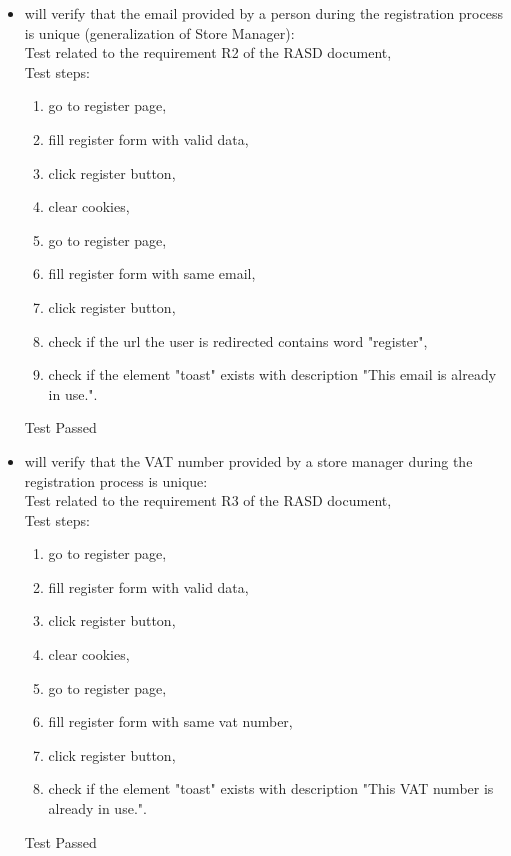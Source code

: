 \begin{itemize}
    \item will verify that the email provided by a person during the registration process is unique (generalization of Store Manager): \\
    Test related to the requirement R2 of the RASD document, \\
    Test steps:
    \begin{enumerate}
        \item go to register page,
        \item fill register form with valid data,
        \item click register button,
        \item clear cookies,
        \item go to register page,
        \item fill register form with same email,
        \item click register button,
        \item check if the url the user is redirected contains word "register",
        \item check if the element "toast" exists with description "This email is already in use.".
    \end{enumerate}
    Test Passed \\

    \item will verify that the VAT number provided by a store manager during the registration process is unique: \\
    Test related to the requirement R3 of the RASD document, \\
    Test steps:
    \begin{enumerate}
        \item go to register page,
        \item fill register form with valid data,
        \item click register button,
        \item clear cookies,
        \item go to register page,
        \item fill register form with same vat number,
        \item click register button,
        \item check if the element "toast" exists with description "This VAT number is already in use.".
    \end{enumerate}
    Test Passed \\


\end{itemize}
